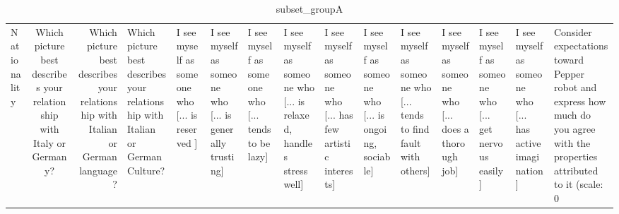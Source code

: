 \begin{table}
\caption{subset_groupA}
\label{tab:subset_groupA}
\begin{tabular}{lcr}
\toprule
Nationality & Which picture best describes your relationship with Italy or Germany? & Which picture best describes your relationship with Italian or German language? & Which picture best describes your relationship with Italian or German Culture? & I see myself as someone who  [... is reserved ] & I see myself as someone who  [... is generally trusting] & I see myself as someone who  [... tends to be lazy] & I see myself as someone who  [... is relaxed, handles stress well] & I see myself as someone who  [... has few artistic interests] & I see myself as someone who  [... is ongoing, sociable] & I see myself as someone who  [... tends to find fault with others] & I see myself as someone who  [... does a thorough job] & I see myself as someone who  [... get nervous easily] & I see myself as someone who  [... has active imagination] & Consider expectations toward Pepper robot and express how much do you agree with the properties attributed to it (scale: 0%
\end{tabular}
\end{table}
